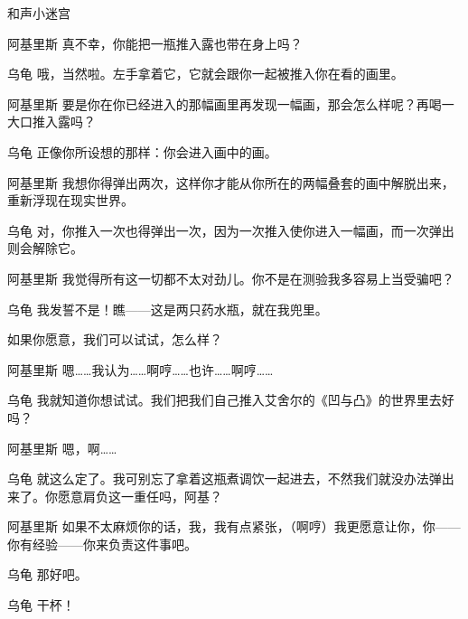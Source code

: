 \begin{dialog}{和声小迷宫}
\begin{dialogue}
\begin{dialogue}
  \item[阿基里斯]真不幸，你能把一瓶推入露也带在身上吗？

  \item[乌龟]哦，当然啦。左手拿着它，它就会跟你一起被推入你在看的画里。

  \item[阿基里斯]要是你在你已经进入的那幅画里再发现一幅画，那会怎么样呢？再喝一大口推入露吗？

  \item[乌龟]正像你所设想的那样：你会进入画中的画。

  \item[阿基里斯]我想你得弹出两次，这样你才能从你所在的两幅叠套的画中解脱出来，重新浮现在现实世界。

  \item[乌龟]对，你推入一次也得弹出一次，因为一次推入使你进入一幅画，而一次弹出则会解除它。

  \item[阿基里斯]我觉得所有这一切都不太对劲儿。你不是在测验我多容易上当受骗吧？

  \item[乌龟]我发誓不是！瞧——这是两只药水瓶，就在我兜里。


  如果你愿意，我们可以试试，怎么样？

  \item[阿基里斯]嗯……我认为……啊哼……也许……啊哼……

  \item[乌龟]我就知道你想试试。我们把我们自己推入艾舍尔的《凹与凸》的世界里去好吗？

  \item[阿基里斯]嗯，啊……

  \item[乌龟]就这么定了。我可别忘了拿着这瓶煮调饮一起进去，不然我们就没办法弹出来了。你愿意肩负这一重任吗，阿基？

  \item[阿基里斯]如果不太麻烦你的话，我，我有点紧张，（啊哼）我更愿意让你，你——你有经验——你来负责这件事吧。

  \item[乌龟]那好吧。


  \item[乌龟]干杯！


\end{dialogue}
\end{dialogue}
\end{dialog}
